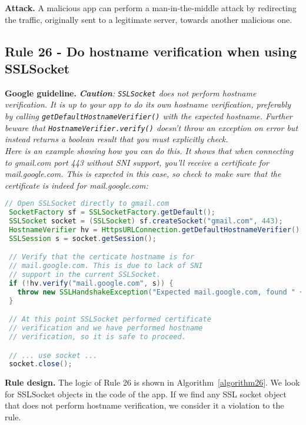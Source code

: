 \textbf{Attack.} A malicious app can perform a man-in-the-middle attack by redirecting the traffic, originally sent to a legitimate server, towards another malicious one. 

\subsection{Rule 26 - Do hostname verification when using SSLSocket}

\textbf{Google guideline.} 
\emph{\textbf{Caution}: \texttt{SSLSocket} does not perform hostname verification. It is up to your app to do its own hostname verification, preferably by calling \texttt{getDefaultHostnameVerifier()} with the expected hostname. Further beware that \texttt{HostnameVerifier.verify()} doesn't throw an exception on error but instead returns a boolean result that you must explicitly check. 
\\
Here is an example showing how you can do this. It shows that when connecting to \textit{gmail.com} port 443 without SNI support, you'll receive a certificate for \textit{mail.google.com}. This is expected in this case, so check to make sure that the certificate is indeed for \textit{mail.google.com}:}
\begin{lstlisting}[language=Java, caption=Warnings about using SSLSocket directly, numbers=none]
 // Open SSLSocket directly to gmail.com
 SocketFactory sf = SSLSocketFactory.getDefault();
 SSLSocket socket = (SSLSocket) sf.createSocket("gmail.com", 443);
 HostnameVerifier hv = HttpsURLConnection.getDefaultHostnameVerifier();
 SSLSession s = socket.getSession();

 // Verify that the certicate hostname is for
 // mail.google.com. This is due to lack of SNI
 // support in the current SSLSocket.
 if (!hv.verify("mail.google.com", s)) {
   throw new SSLHandshakeException("Expected mail.google.com, found " + s.getPeerPrincipal());
 }

 // At this point SSLSocket performed certificate
 // verification and we have performed hostname
 // verification, so it is safe to proceed.

 // ... use socket ...
 socket.close();

 \end{lstlisting}
 
\textbf{Rule design.} The logic of Rule 26 is shown in Algorithm~\ref{algorithm26}. We look for SSLSocket objects in the code of the app. If we find any SSL socket object that does not perform hostname verification, we consider it a violation to the rule. 

